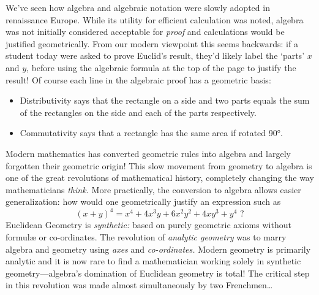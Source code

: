 We've seen how algebra and algebraic notation were slowly adopted in renaissance Europe. While its utility for efficient calculation was noted, algebra was not initially considered acceptable for \emph{proof} and calculations would be justified geometrically. From our modern viewpoint this seems backwards: if a student today were asked to prove Euclid's result, they'd likely label the `parts' $x$ and $y$, before using the algebraic formula at the top of the page to justify the result! Of course each line in the algebraic proof has a geometric basis:
\begin{itemize}
  \item Distributivity says that the rectangle on a side and two parts equals the sum of the rectangles on the side and each of the parts respectively.
  \item Commutativity says that a rectangle has the same area if rotated \ang{90}.
\end{itemize}
Modern mathematics has converted geometric rules into algebra and largely forgotten their geometric origin! This slow movement from geometry to algebra is one of the great revolutions of mathematical history, completely changing the way mathematicians \emph{think.} More practically, the conversion to algebra allows easier generalization: how would one geometrically justify an expression such as
\[
	(x+y)^4=x^4+4x^3y+6x^2y^2+4xy^3+y^4\text{ ?}
\]
Euclidean Geometry is \emph{synthetic:} based on purely geometric axioms without formulæ or co-ordinates. The revolution of \emph{analytic geometry} was to marry algebra and geometry using \emph{axes} and \emph{co-ordinates.} Modern geometry is primarily analytic and it is now rare to find a mathematician working solely in synthetic geometry---algebra's domination of Euclidean geometry is total! The critical step in this revolution was made almost simultaneously by two Frenchmen\ldots
\goodbreak


